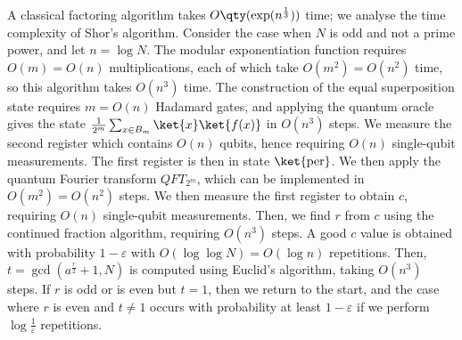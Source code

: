 A classical factoring algorithm takes $O\qty(\exp(n^{\frac{1}{3}}))$ time; we analyse the time complexity of Shor's algorithm.
Consider the case when $N$ is odd and not a prime power, and let $n = \log N$.
The modular exponentiation function requires $O(m) = O(n)$ multiplications, each of which take $O(m^2) = O(n^2)$ time, so this algorithm takes $O(n^3)$ time.
The construction of the equal superposition state requires $m = O(n)$ Hadamard gates, and applying the quantum oracle gives the state $\frac{1}{2^m} \sum_{x \in B_m} \ket{x} \ket{f(x)}$ in $O(n^3)$ steps.
We measure the second register which contains $O(n)$ qubits, hence requiring $O(n)$ single-qubit measurements.
The first register is then in state $\ket{\mathrm{per}}$.
We then apply the quantum Fourier transform $QFT_{2^m}$, which can be implemented in $O(m^2) = O(n^2)$ steps.
We then measure the first register to obtain $c$, requiring $O(n)$ single-qubit measurements.
Then, we find $r$ from $c$ using the continued fraction algorithm, requiring $O(n^3)$ steps.
A good $c$ value is obtained with probability $1 - \varepsilon$ with $O(\log \log N) = O(\log n)$ repetitions.
Then, $t = \gcd(a^{\frac{r}{2}} + 1, N)$ is computed using Euclid's algorithm, taking $O(n^3)$ steps.
If $r$ is odd or is even but $t = 1$, then we return to the start, and the case where $r$ is even and $t \neq 1$ occurs with probability at least $1 - \varepsilon$ if we perform $\log \frac{1}{\varepsilon}$ repetitions.
